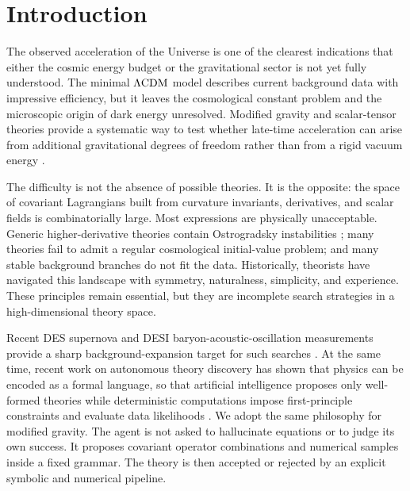 \documentclass[aps,prd,twocolumn,superscriptaddress,nofootinbib,longbibliography]{revtex4-2}
\newcommand{\LCDM}{\Lambda{\rm CDM}}
\begin{document}
\maketitle

\section{Introduction}
\label{sec:introduction}

The observed acceleration of the Universe is one of the clearest indications that either the cosmic energy budget or the gravitational sector is not yet fully understood.  The minimal $\LCDM$ model describes current background data with impressive efficiency, but it leaves the cosmological constant problem and the microscopic origin of dark energy unresolved.  Modified gravity and scalar-tensor theories provide a systematic way to test whether late-time acceleration can arise from additional gravitational degrees of freedom rather than from a rigid vacuum energy \cite{Clifton2012,SotiriouFaraoni2010,Horndeski1974}.

The difficulty is not the absence of possible theories.  It is the opposite: the space of covariant Lagrangians built from curvature invariants, derivatives, and scalar fields is combinatorially large.  Most expressions are physically unacceptable.  Generic higher-derivative theories contain Ostrogradsky instabilities \cite{Ostrogradsky1850}; many theories fail to admit a regular cosmological initial-value problem; and many stable background branches do not fit the data.  Historically, theorists have navigated this landscape with symmetry, naturalness, simplicity, and experience.  These principles remain essential, but they are incomplete search strategies in a high-dimensional theory space.

Recent DES supernova and DESI baryon-acoustic-oscillation measurements provide a sharp background-expansion target for such searches \cite{DES2024SN,DESI2025BAO}.  At the same time, recent work on autonomous theory discovery has shown that physics can be encoded as a formal language, so that artificial intelligence proposes only well-formed theories while deterministic computations impose first-principle constraints and evaluate data likelihoods \cite{Alexander2026Albert}.  We adopt the same philosophy for modified gravity.  The agent is not asked to hallucinate equations or to judge its own success.  It proposes covariant operator combinations and numerical samples inside a fixed grammar.  The theory is then accepted or rejected by an explicit symbolic and numerical pipeline.
\end{document}
